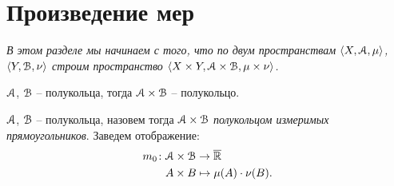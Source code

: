 \section{Произведение мер}

\textit{В этом разделе мы начинаем с того, что по двум пространствам
    $\langle X, \mathcal{A}, \mu \rangle$, $\langle Y, \mathcal{B}, \nu \rangle$ строим пространство
$\langle X \times Y, \mathcal{A} \times \mathcal{B}, \mu \times \nu \rangle$.}

\begin{lemma}
    $\mathcal{A}$, $\mathcal{B}$ -- полукольца, тогда $\mathcal{A} \times \mathcal{B}$ -- полукольцо.
\end{lemma}

\begin{definition}
    $\mathcal{A}$, $\mathcal{B}$ -- полукольца, назовем тогда $\mathcal{A} \times \mathcal{B}$ \textit{полукольцом
    измеримых прямоугольников}. Заведем отображение:
    \begin{align*}
        m_0 \colon &\mathcal{A} \times \mathcal{B} \to \overline{\mathbb{R}} \\
                   &A \times B \mapsto \mu(A) \cdot \nu(B)
    .\end{align*}
\end{definition}


